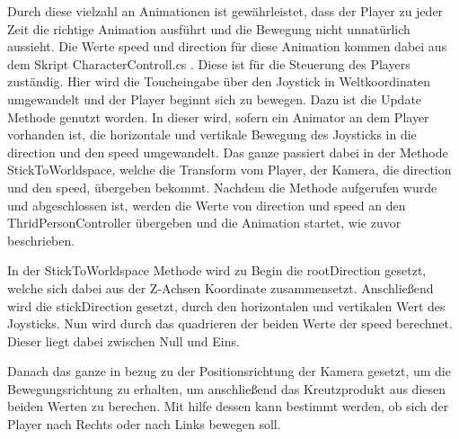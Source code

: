 	Durch diese vielzahl an Animationen ist gewährleistet, dass der Player zu jeder Zeit die richtige Animation ausführt und die Bewegung nicht unnatürlich aussieht. Die Werte speed und direction für diese Animation kommen dabei aus dem Skript CharacterControll.cs . Diese ist für die Steuerung des Players zuständig. Hier wird die Toucheingabe über den Joystick in Weltkoordinaten umgewandelt und der Player beginnt sich zu bewegen. Dazu ist die Update Methode genutzt worden. In dieser wird, sofern ein Animator an dem Player vorhanden ist, die horizontale und vertikale Bewegung des Joysticks in die direction und den speed umgewandelt. Das ganze passiert dabei in der Methode StickToWorldspace, welche die Transform vom Player, der Kamera, die direction und den speed, übergeben bekommt. Nachdem die Methode aufgerufen wurde und abgeschlossen ist, werden die Werte von direction und speed an den ThridPersonController übergeben und die Animation startet, wie zuvor beschrieben.

	In der StickToWorldspace Methode wird zu Begin die rootDirection gesetzt, welche sich dabei aus der Z-Achsen Koordinate zusammensetzt. Anschließend wird die stickDirection gesetzt, durch den horizontalen und vertikalen Wert des Joysticks. Nun wird durch das quadrieren der beiden Werte der speed berechnet. Dieser liegt dabei zwischen Null und Eins.

	Danach das ganze in bezug zu der Positionsrichtung der Kamera gesetzt, um die Bewegungsrichtung zu erhalten, um anschließend das Kreutzprodukt aus diesen beiden Werten zu berechen. Mit hilfe dessen kann bestimmt werden, ob sich der Player nach Rechts oder nach Links bewegen soll.

